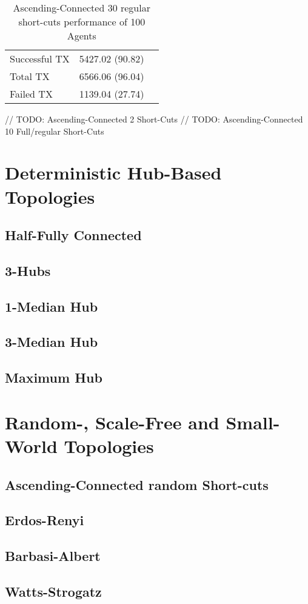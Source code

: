 \documentclass[Bachelorarbeit.tex]{subfiles}
\begin{document}
\begin{table}[!htbp]
	\caption{Ascending-Connected 30 regular short-cuts performance of 100 Agents}
	\centering
	\begin{tabular} { l c r }
		\hline
		Successful TX & 5427.02 (90.82) \\
		Total TX & 6566.06 (96.04) \\
		Failed TX & 1139.04 (27.74) \\
		\hline
	\end{tabular}
\end{table}

// TODO: Ascending-Connected 2 Short-Cuts
// TODO: Ascending-Connected 10 Full/regular Short-Cuts


\section{Deterministic Hub-Based Topologies} 

\subsection{Half-Fully Connected}
\subsection{3-Hubs}
\subsection{1-Median Hub}
\subsection{3-Median Hub}
\subsection{Maximum Hub}



\section{Random-, Scale-Free and Small-World Topologies}
\subsection{Ascending-Connected random Short-cuts}
\subsection{Erdos-Renyi}
\subsection{Barbasi-Albert}
\subsection{Watts-Strogatz}
\end{document}
